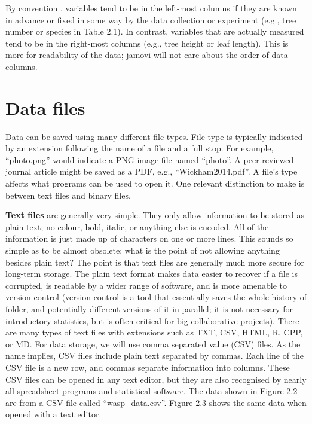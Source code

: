 \documentclass[
  openany]{krantz}
\begin{document}
By convention \citep{Wickham2014}, variables tend to be in the left-most columns if they are known in advance or fixed in some way by the data collection or experiment (e.g., tree number or species in Table 2.1).
In contrast, variables that are actually measured tend to be in the right-most columns (e.g., tree height or leaf length).
This is more for readability of the data; jamovi will not care about the order of data columns.

\hypertarget{data-files}{%
\section{Data files}\label{data-files}}

Data can be saved using many different file types.
File type is typically indicated by an extension following the name of a file and a full stop.
For example, ``photo.png'' would indicate a PNG image file named ``photo''.
A peer-reviewed journal article might be saved as a PDF, e.g., ``Wickham2014.pdf''.
A file's type affects what programs can be used to open it.
One relevant distinction to make is between text files and binary files.

\textbf{Text files} are generally very simple.
They only allow information to be stored as plain text; no colour, bold, italic, or anything else is encoded.
All of the information is just made up of characters on one or more lines.
This sounds so simple as to be almost obsolete; what is the point of not allowing anything besides plain text?
The point is that text files are generally much more secure for long-term storage.
The plain text format makes data easier to recover if a file is corrupted, is readable by a wider range of software, and is more amenable to version control (version control is a tool that essentially saves the whole history of folder, and potentially different versions of it in parallel; it is not necessary for introductory statistics, but is often critical for big collaborative projects).
There are many types of text files with extensions such as TXT, CSV, HTML, R, CPP, or MD.
For data storage, we will use comma separated value (CSV) files.
As the name implies, CSV files include plain text separated by commas.
Each line of the CSV file is a new row, and commas separate information into columns.
These CSV files can be opened in any text editor, but they are also recognised by nearly all spreadsheet programs and statistical software.
The data shown in Figure 2.2 are from a CSV file called ``wasp\_data.csv''.
Figure 2.3 shows the same data when opened with a text editor.
\end{document}
